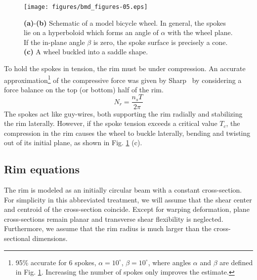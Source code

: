\documentclass{bmd2016p}
\begin{document}
\begin{figure}[!h]
\centering
\texttt{[image: figures/bmd\_figures-05.eps]}
\caption{\textbf{(a)}-\textbf{(b)} Schematic of a model bicycle wheel. In general, the spokes lie on a hyperboloid which forms an angle of $\alpha$ with the wheel plane. If the in-plane angle $\beta$ is zero, the spoke surface is precisely a cone. \textbf{(c)} A wheel buckled into a saddle shape.}
\label{fig:schematic}
\end{figure}

To hold the spokes in tension, the rim must be under compression. An accurate approximation\footnote{95\% accurate for 6 spokes, $\alpha=10^{\circ}$, $\beta=10^{\circ}$, where angles $\alpha$ and $\beta$ are defined in Fig. \ref{fig:schematic}. Increasing the number of spokes only improves the estimate.} of the compressive force was given by Sharp~\cite{Sharp1977a} by considering a force balance on the top (or bottom) half of the rim.
	\begin{equation}\label{eq:TN}
	N_r = \frac{n_sT}{2\pi}
	\end{equation}
The spokes act like guy-wires, both supporting the rim radially and stabilizing the rim laterally. However, if the spoke tension exceeds a critical value $T_c$, the compression in the rim causes the wheel to buckle laterally, bending and twisting out of its initial plane, as shown in Fig. \ref{fig:schematic} (c).


\subsection{Rim equations}

The rim is modeled as an initially circular beam with a constant cross-section. For simplicity in this abbreviated treatment, we will assume that the shear center and centroid of the cross-section coincide. Except for warping deformation, plane cross-sections remain planar and transverse shear flexibility is neglected. Furthermore, we assume that the rim radius is much larger than the cross-sectional dimensions.
\end{document}
